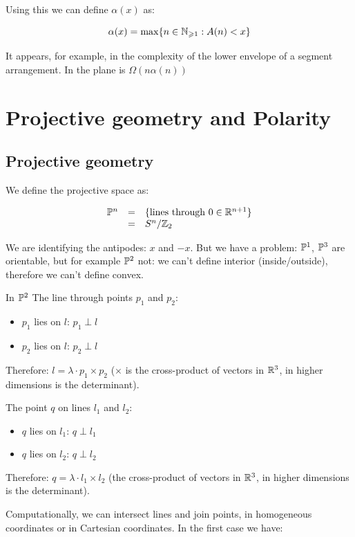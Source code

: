 Using this we can define $\alpha(x)$ as:

$$\alpha(x)=\max\{n\in\mathbb{N}_{\geqslant 1}:A(n)<x\}$$

It appears, for example, in the complexity of the lower envelope of a segment arrangement. In the plane is $\Omega(n\alpha(n))$

\section{Projective geometry and Polarity}
\subsection{Projective geometry}

We define the projective space as:

$$\begin{array}{rcl}
   \mathbb{P}^n	&=	&\{\text{lines through }0\in\mathbb{R}^{n+1} \}	\\
		&=	&S^n/\mathbb{Z}_2
  \end{array}
$$

We are identifying the antipodes: $x$ and $-x$. But we have a problem: $\mathbb{P}^1$, $\mathbb{P}^3$ are orientable, but for example $\mathbb{P}^2$ not: we can't define interior (inside/outside), therefore we can't define convex.

In $\mathbb{P}^2$ The line through points $p_1$ and $p_2$:

\begin{itemize}
\item $p_1$ lies on $l$: $p_1\perp l$
\item $p_2$ lies on $l$: $p_2\perp l$
\end{itemize}

Therefore: $l = \lambda \cdot  p_1 \times p_2$ ($\times$ is the cross-product of vectors in $\mathbb{R}^3$, in higher dimensions is the determinant).

The point $q$ on lines $l_1$ and $l_2$:

\begin{itemize}
\item $q$ lies on $l_1$: $q\perp l_1$
\item$q$ lies on $l_2$: $q\perp l_2$
\end{itemize}

Therefore: $q = \lambda \cdot l_1 \times l_2$ (the cross-product of vectors in $\mathbb{R}^3$, in higher dimensions is the determinant).

Computationally, we can intersect lines and join points, in homogeneous coordinates or in Cartesian coordinates. In the first case we have:

